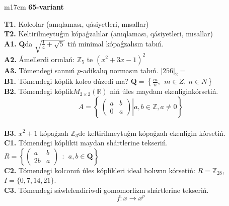 \documentclass{article}
\begin{document}
\begin{tabular}{m{17cm}}
\textbf{65-variant}
\newline

\textbf{T1.} Kolcolar (anıqlaması, qásiyetleri, mısallar) \\
\textbf{T2.} Keltirilmeytuǵın kópaǵzalılar (anıqlaması, qásiyetleri, mısallar) \\
\textbf{A1.} \(\mathbf{Q}\)da \(\sqrt{\frac{1}{4} + \sqrt{5}}\) tiń minimal kópaǵzalısın tabıń. \\
\textbf{A2.} Ámellerdi orınlań: \(\mathbb{Z}_{5}\) te \(\left( x^{2} + 3x - 1 \right)^{2}\) \\
\textbf{A3.} Tómendegi sannıń \(p\)-adikalıq normasın tabıń. \(|256|_{2} =\) \\
\textbf{B1.} Tómendegi kóplik kolco dúzedi ma? \(\mathbf{Q} = \left\{ \frac{m}{n},\ \ m \in Z,\ n \in N \right\}\) \\
\textbf{B2.} Tómendegi kóplik\(M_{2 \times 2}\left( \mathbb{R} \right)\) niń úles maydanı ekenliginkórsetiń.
\[A = \left\{ \left. \ \begin{pmatrix}
a & b \\
0 & a
\end{pmatrix} \right|a,b\mathbb{\in Z},a \neq 0 \right\}\] \\
\textbf{B3.} \(x^{2} + 1\) kópaǵzalı \(\mathbb{Z}_{3}\)de keltirilmeytuǵın kópaǵzalı ekenligin kórsetiń. \\
\textbf{C1.} Tómendegi kóplikti maydan shártlerine tekseriń. \(R = \left\{ \begin{pmatrix}
a & b \\
2b & a
\end{pmatrix}\ \ :\ \ a,b \in \mathbf{Q} \right\}\) \\
\textbf{C2.} Tómendegi kolconıń úles kóplikleri ideal bolıwın kórsetiń:
\(R = \mathbb{Z}_{28}\), \(I = \{\overline{0},\overline{7},\overline{14},\overline{21}\}\). \\
\textbf{C3.} Tómendegi sáwlelendiriwdi gomomorfizm shártlerine tekseriń.
\[f:x \rightarrow x^{p}\] \\

\end{tabular}
\vspace{1cm}
\end{document}
